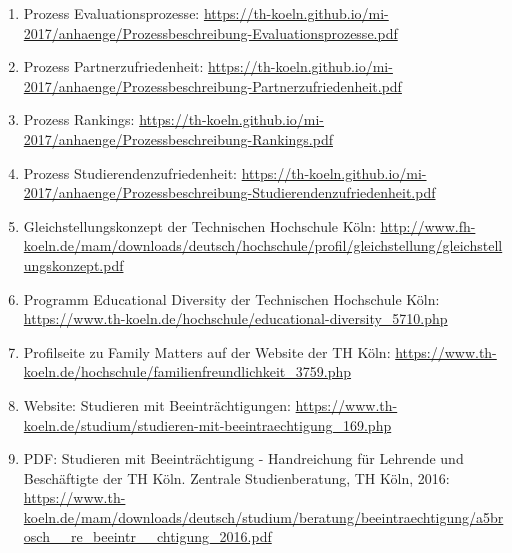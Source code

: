 \documentclass[BCOR12mm,DIV11,titlepage,a4paper,oneside,10pt]{scrbook}
\begin{document}
\begin{sloppypar}
\begin{flushleft}
\begin{enumerate}
\item{Prozess Evaluationsprozesse: \url{https://th-koeln.github.io/mi-2017/anhaenge/Prozessbeschreibung-Evaluationsprozesse.pdf} } 
\item{Prozess Partnerzufriedenheit: \url{https://th-koeln.github.io/mi-2017/anhaenge/Prozessbeschreibung-Partnerzufriedenheit.pdf} } 
\item{Prozess Rankings: \url{https://th-koeln.github.io/mi-2017/anhaenge/Prozessbeschreibung-Rankings.pdf} } 
\item{Prozess Studierendenzufriedenheit: \url{https://th-koeln.github.io/mi-2017/anhaenge/Prozessbeschreibung-Studierendenzufriedenheit.pdf} } 
\item{Gleichstellungskonzept der Technischen Hochschule Köln: \url{http://www.fh-koeln.de/mam/downloads/deutsch/hochschule/profil/gleichstellung/gleichstellungskonzept.pdf} } 
\item{Programm Educational Diversity der Technischen Hochschule Köln: \url{https://www.th-koeln.de/hochschule/educational-diversity\_5710.php} } 
\item{Profilseite zu Family Matters auf der Website der TH Köln: \url{https://www.th-koeln.de/hochschule/familienfreundlichkeit\_3759.php} } 
\item{Website: Studieren mit Beeinträchtigungen: \url{https://www.th-koeln.de/studium/studieren-mit-beeintraechtigung\_169.php} } 
\item{PDF: Studieren mit Beeinträchtigung - Handreichung für Lehrende und Beschäftigte der TH Köln. Zentrale Studienberatung, TH Köln, 2016: \url{https://www.th-koeln.de/mam/downloads/deutsch/studium/beratung/beeintraechtigung/a5brosch\_\_re\_beeintr\_\_chtigung\_2016.pdf} } 

\end{enumerate}

\end{flushleft}
\end{sloppypar}

\backmatter
\end{document}
